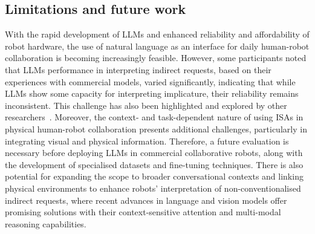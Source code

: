 \subsection{Limitations and future work}
With the rapid development of LLMs and enhanced reliability and affordability of robot hardware, the use of natural language as an interface for daily human-robot collaboration is becoming increasingly feasible. However, some participants noted that LLMs performance in interpreting indirect requests, based on their experiences with commercial models, varied significantly, indicating that while LLMs show some capacity for interpreting implicature, their reliability remains inconsistent. This challenge has also been highlighted and explored by other researchers~\cite{ruis2024goldilocks, jin2024reasoning}. Moreover, the context- and task-dependent nature of using ISAs in physical human-robot collaboration presents additional challenges, particularly in integrating visual and physical information. Therefore, a future evaluation is necessary before deploying LLMs in commercial collaborative robots, along with the development of specialised datasets and fine-tuning techniques. There is also potential for expanding the scope to broader conversational contexts and linking physical environments to enhance robots' interpretation of non-conventionalised indirect requests, where recent advances in language and vision models offer promising solutions with their context-sensitive attention and multi-modal reasoning capabilities. 


